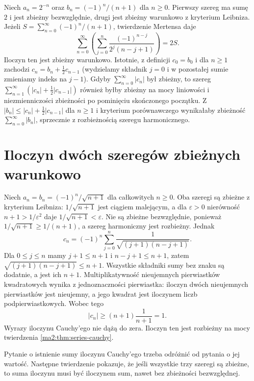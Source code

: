 \begin{przyklad}
Niech $a_n=2^{-n}$ oraz $b_n=(-1)^n/(n+1)$ dla $n\ge0$. Pierwszy szereg ma sumę $2$ i jest zbieżny bezwzględnie, drugi jest zbieżny warunkowo z kryterium Leibniza. Jeżeli $S=\sum_{n=0}^\infty(-1)^n/(n+1)$, twierdzenie Mertensa daje
\[
 \sum_{n=0}^\infty\left(\sum_{j=0}^n\frac{(-1)^{n-j}}{2^j(n-j+1)}\right)=2S.
\]
Iloczyn ten jest zbieżny warunkowo. Istotnie, z definicji $c_0=b_0$ i dla $n\ge1$ zachodzi $c_n=b_n+\frac12c_{n-1}$ (wydzielamy składnik $j=0$ i w pozostałej sumie zmieniamy indeks na $j-1$). Gdyby $\sum_{n=0}^\infty|c_n|$ był zbieżny, to szereg $\sum_{n=1}^\infty(|c_n|+\frac12|c_{n-1}|)$ również byłby zbieżny na mocy liniowości i niezmienniczości zbieżności po pominięciu skończonego początku. Z $|b_n|\le |c_n|+\frac12|c_{n-1}|$ dla $n\ge1$ i kryterium porównawczego wynikałaby zbieżność $\sum_{n=0}^\infty|b_n|$, sprzecznie z rozbieżnością szeregu harmonicznego.
\end{przyklad}

\section{Iloczyn dwóch szeregów zbieżnych warunkowo}
\begin{przyklad}
\label{ma1:ex:divergent-cauchy-product}
Niech $a_n=b_n=(-1)^n/\sqrt{n+1}$ dla całkowitych $n\ge0$. Oba szeregi są zbieżne z kryterium Leibniza: $1/\sqrt{n+1}$ jest ciągiem malejącym, a dla $\varepsilon>0$ nierówność $n+1>1/\varepsilon^2$ daje $1/\sqrt{n+1}<\varepsilon$. Nie są zbieżne bezwzględnie, ponieważ $1/\sqrt{n+1}\ge1/(n+1)$, a szereg harmoniczny jest rozbieżny.
Jednak
\[
 c_n=(-1)^n\sum_{j=0}^n
       \frac1{\sqrt{(j+1)(n-j+1)}}.
\]
Dla $0\le j\le n$ mamy $j+1\le n+1$ i $n-j+1\le n+1$, zatem $\sqrt{(j+1)(n-j+1)}\le n+1$. Wszystkie składniki sumy bez znaku są dodatnie, a jest ich $n+1$. Multiplikatywność nieujemnych pierwiastków kwadratowych wynika z jednoznaczności pierwiastka: iloczyn dwóch nieujemnych pierwiastków jest nieujemny, a jego kwadrat jest iloczynem liczb podpierwiastkowych. Wobec tego
\[
 |c_n|\ge(n+1)\frac1{n+1}=1.
\]
Wyrazy iloczynu Cauchy'ego nie dążą do zera. Iloczyn ten jest rozbieżny na mocy twierdzenia \ref{ma2:thm:series-cauchy}.
\end{przyklad}
Pytanie o istnienie sumy iloczynu Cauchy'ego trzeba odróżnić od pytania o jej wartość. Następne twierdzenie pokazuje, że jeśli wszystkie trzy szeregi są zbieżne, to suma iloczynu musi być iloczynem sum, nawet bez zbieżności bezwzględnej.

